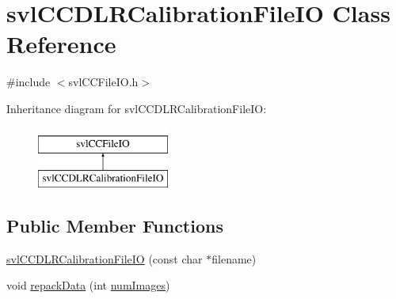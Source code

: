 \hypertarget{classsvl_c_c_d_l_r_calibration_file_i_o}{}\section{svl\+C\+C\+D\+L\+R\+Calibration\+File\+I\+O Class Reference}
\label{classsvl_c_c_d_l_r_calibration_file_i_o}


{\ttfamily \#include $<$svl\+C\+C\+File\+I\+O.\+h$>$}

Inheritance diagram for svl\+C\+C\+D\+L\+R\+Calibration\+File\+I\+O\+:\begin{figure}[H]
\begin{center}
\leavevmode
\includegraphics[height=2.000000cm]{dc/d4d/classsvl_c_c_d_l_r_calibration_file_i_o}
\end{center}
\end{figure}
\subsection*{Public Member Functions}
\begin{DoxyCompactItemize}
\item 
\hyperlink{classsvl_c_c_d_l_r_calibration_file_i_o_ae2ce7aa7ab6d63b35267ac0dc4d736e7}{svl\+C\+C\+D\+L\+R\+Calibration\+File\+I\+O} (const char $\ast$filename)
\item 
void \hyperlink{classsvl_c_c_d_l_r_calibration_file_i_o_ad2903af380edfd676bb57b8c15698dc4}{repack\+Data} (int \hyperlink{classsvl_c_c_d_l_r_calibration_file_i_o_aea95d20c4c61996153cb1ca3732f7f00}{num\+Images})
\end{DoxyCompactItemize}
